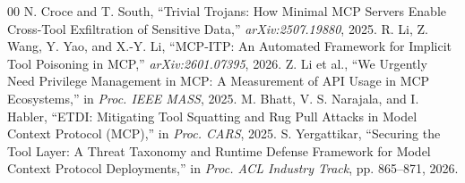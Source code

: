 \documentclass[conference]{IEEEtran}
\begin{document}
\begin{thebibliography}{00}
 N. Croce and T. South, ``Trivial Trojans: How Minimal MCP Servers Enable Cross-Tool Exfiltration of Sensitive Data,'' \textit{arXiv:2507.19880}, 2025.
 R. Li, Z. Wang, Y. Yao, and X.-Y. Li, ``MCP-ITP: An Automated Framework for Implicit Tool Poisoning in MCP,'' \textit{arXiv:2601.07395}, 2026.
 Z. Li et al., ``We Urgently Need Privilege Management in MCP: A Measurement of API Usage in MCP Ecosystems,'' in \textit{Proc. IEEE MASS}, 2025.
 M. Bhatt, V. S. Narajala, and I. Habler, ``ETDI: Mitigating Tool Squatting and Rug Pull Attacks in Model Context Protocol (MCP),'' in \textit{Proc. CARS}, 2025.
 S. Yergattikar, ``Securing the Tool Layer: A Threat Taxonomy and Runtime Defense Framework for Model Context Protocol Deployments,'' in \textit{Proc. ACL Industry Track}, pp. 865--871, 2026.
\end{thebibliography}
\end{document}
